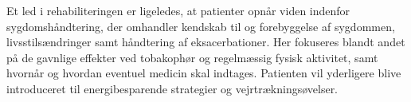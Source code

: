 Et led i rehabiliteringen er ligeledes, at patienter opnår viden indenfor sygdomshåndtering, der omhandler kendskab til og forebyggelse af sygdommen, livsstilsændringer samt håndtering af eksacerbationer.\cite{McCarthy2015,Sundhedsstyrelsen2015} Her fokuseres blandt andet på de gavnlige effekter ved tobakophør og regelmæssig fysisk aktivitet, samt hvornår og hvordan eventuel medicin skal indtages. Patienten vil yderligere blive introduceret til energibesparende strategier og vejrtrækningsøvelser. \cite{McCarthy2015,Sundhedsstyrelsen2015}    

